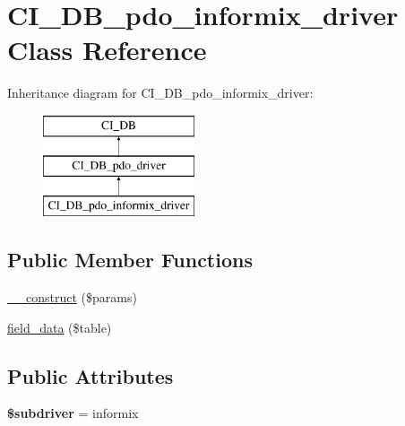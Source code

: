\hypertarget{class_c_i___d_b__pdo__informix__driver}{}\section{C\+I\+\_\+\+D\+B\+\_\+pdo\+\_\+informix\+\_\+driver Class Reference}
\label{class_c_i___d_b__pdo__informix__driver}
Inheritance diagram for C\+I\+\_\+\+D\+B\+\_\+pdo\+\_\+informix\+\_\+driver\+:\begin{figure}[H]
\begin{center}
\leavevmode
\includegraphics[height=3.000000cm]{class_c_i___d_b__pdo__informix__driver}
\end{center}
\end{figure}
\subsection*{Public Member Functions}
\begin{DoxyCompactItemize}
\item 
\mbox{\hyperlink{class_c_i___d_b__pdo__informix__driver_a47f83ea300c50f6d8f9476409c374a2d}{\+\_\+\+\_\+construct}} (\$params)
\item 
\mbox{\hyperlink{class_c_i___d_b__pdo__informix__driver_a0c07597d9e51ef25a5ddb95a0ebb6933}{field\+\_\+data}} (\$table)
\end{DoxyCompactItemize}
\subsection*{Public Attributes}
\begin{DoxyCompactItemize}
\item 
\mbox{\label{class_c_i___d_b__pdo__informix__driver_a575b0eadfe868f6d29e030b7f6842238}} 
{\bfseries \$subdriver} = \textquotesingle{}informix\textquotesingle{}
\end{DoxyCompactItemize}
